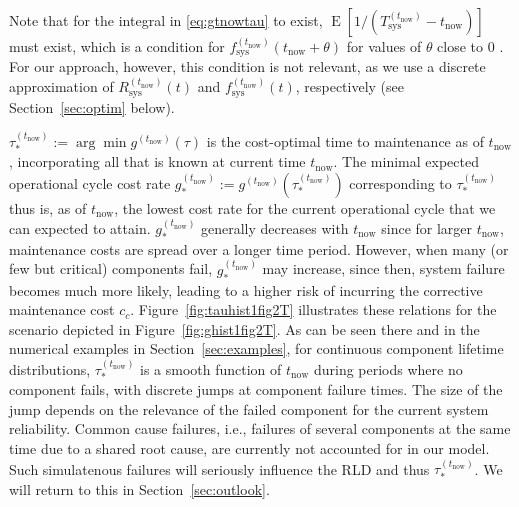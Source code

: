 \documentclass[authoryear]{elsarticle}
\newcommand{\E}{\operatorname{E}}
\def\tnow{t_\text{now}}
\newcommand{\Rsysnow}{R^{(t_\text{now})}_\text{sys}}
\newcommand{\Tsysnow}{T^{(t_\text{now})}_\text{sys}}
\newcommand{\fsysnow}{f^{(t_\text{now})}_\text{sys}}
\newcommand{\gnow}{g^{(\tnow)}}
\newcommand{\tausnow}{\tau_*^{(\tnow)}}
\newcommand{\tstarnow}{t_*^{(\tnow)}}
\newcommand{\gstarnow}{g_*^{(\tnow)}}
\newcommand{\gtotalnow}{g_\text{total}^{(\tnow)}}
\begin{document}
Note that for the integral in \eqref{eq:gtnowtau} to exist,
$\E[1/(\Tsysnow - \tnow)]$ must exist,
which is a condition for $\fsysnow(\tnow + \theta)$ for values of $\theta$ close to $0$ \citep{2006:coolen-schrijner-coolen}.
For our approach, however, this condition is not relevant,
as we use a discrete approximation of $\Rsysnow(t)$ and $\fsysnow(t)$, respectively
(see Section~\ref{sec:optim} below).

$\tausnow := \arg\min \gnow(\tau)$
is the cost-optimal time to maintenance as of $\tnow$,
incorporating all that is known at current time $\tnow$.
The minimal expected operational cycle cost rate $\gstarnow := \gnow(\tausnow)$ corresponding to $\tausnow$
thus is, as of $\tnow$, the lowest cost rate for the current operational cycle
that we can expected to attain.
$\gstarnow$ generally decreases with $\tnow$ since for larger $\tnow$, maintenance costs are spread over a longer time period.
However, when many (or few but critical) components fail, $\gstarnow$ may increase,
since then, system failure becomes much more likely, leading to a higher risk of incurring the corrective maintenance cost $c_c$.
Figure~\ref{fig:tauhist1fig2T} illustrates these relations for the scenario depicted in Figure~\ref{fig:ghist1fig2T}.
%
As can be seen there and in the numerical examples in Section~\ref{sec:examples},
for continuous component lifetime distributions,
$\tausnow$ is a smooth function of $\tnow$ during periods where no component fails,
with discrete jumps at component failure times.
The size of the jump depends on the relevance of the failed component for the current system reliability.
Common cause failures, i.e., failures of several components at the same time due to a shared root cause,
are currently not accounted for in our model. %
Such simulatenous failures will seriously influence the RLD and thus $\tausnow$.
We will return to this in Section~\ref{sec:outlook}.
%
\end{document}
